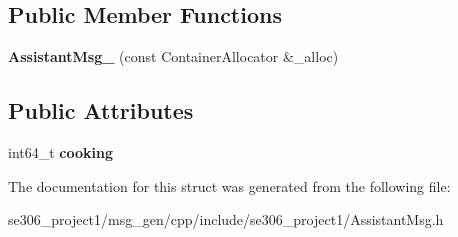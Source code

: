\subsection*{Public Member Functions}
\begin{DoxyCompactItemize}
\item 
\hypertarget{structse306__project1_1_1AssistantMsg___af325d6761ff1fe9faf15d9191ecf30a9}{{\bfseries Assistant\-Msg\-\_\-} (const Container\-Allocator \&\-\_\-alloc)}\label{structse306__project1_1_1AssistantMsg___af325d6761ff1fe9faf15d9191ecf30a9}

\end{DoxyCompactItemize}
\subsection*{Public Attributes}
\begin{DoxyCompactItemize}
\item 
\hypertarget{structse306__project1_1_1AssistantMsg___a18beb4c8f59446b29c83003fa5007bea}{int64\-\_\-t {\bfseries cooking}}\label{structse306__project1_1_1AssistantMsg___a18beb4c8f59446b29c83003fa5007bea}

\end{DoxyCompactItemize}


The documentation for this struct was generated from the following file\-:\begin{DoxyCompactItemize}
\item 
se306\-\_\-project1/msg\-\_\-gen/cpp/include/se306\-\_\-project1/Assistant\-Msg.\-h\end{DoxyCompactItemize}

